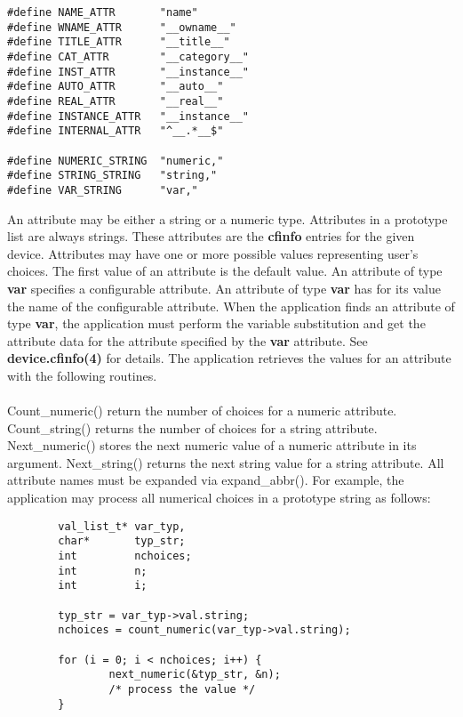 {\small \begin{verbatim}
#define NAME_ATTR       "name"
#define WNAME_ATTR      "__owname__"
#define TITLE_ATTR      "__title__"
#define CAT_ATTR        "__category__"
#define INST_ATTR       "__instance__"
#define AUTO_ATTR       "__auto__"
#define REAL_ATTR       "__real__"
#define INSTANCE_ATTR   "__instance__"
#define INTERNAL_ATTR   "^__.*__$"

#define NUMERIC_STRING  "numeric,"
#define STRING_STRING   "string,"
#define VAR_STRING      "var,"
\end{verbatim}}

An attribute may be either a string or a numeric type.  Attributes in a
prototype list are always strings. These attributes are the {\bf
cfinfo} entries for the given device.  Attributes may have one or more
possible values representing user's choices.  The first value of an
attribute is the default value.  An attribute of type {\bf var}
specifies a configurable attribute.  An attribute of type {\bf var} has
for its value the name of the configurable attribute.  When the
application finds an attribute of type {\bf var}, the application must
perform the variable substitution and get the attribute data for the
attribute specified by the {\bf var} attribute.  See {\bf
device.cfinfo(4)} for details.  The application retrieves the values
for an attribute with the following routines. \\

{\small \tt {}} \\

Count\_numeric() return the number of choices for a numeric attribute.
Count\_string() returns the number of choices for a string attribute.
Next\_numeric() stores the next numeric value of a numeric attribute in
its argument.  Next\_string() returns the next string value for a
string attribute.  All attribute names must be expanded via
expand\_abbr().  For example, the application may process all numerical
choices in a prototype string as follows:

{\small \begin{verbatim}
        val_list_t* var_typ,
        char*       typ_str;
        int         nchoices;
        int         n;
        int         i;

        typ_str = var_typ->val.string;
        nchoices = count_numeric(var_typ->val.string);

        for (i = 0; i < nchoices; i++) {
                next_numeric(&typ_str, &n);
                /* process the value */
        }
\end{verbatim}}

